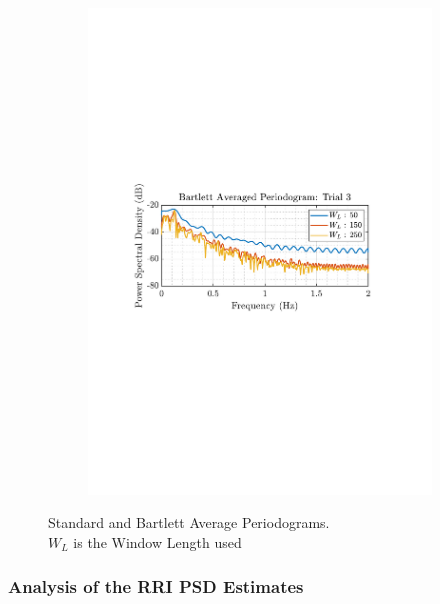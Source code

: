 \documentclass[12pt]{article}
\begin{document}
\begin{figure}[H]
\begin{subfigure}{0.49\textwidth}
			\includegraphics[trim={2.2cm 11.2cm 3.15cm  11.2cm}, clip, width=\textwidth]{../MATLAB/figures/q1_5a_fig06.pdf} 
		\end{subfigure}
		\captionsetup{justification=centering}
		\caption{Standard and Bartlett Average Periodograms. \\ $W_L$ is the Window Length used}
		\label{fig: 1-5a}
	\end{figure}

	\subsubsection{Analysis of the RRI PSD Estimates}
	
\end{document}
